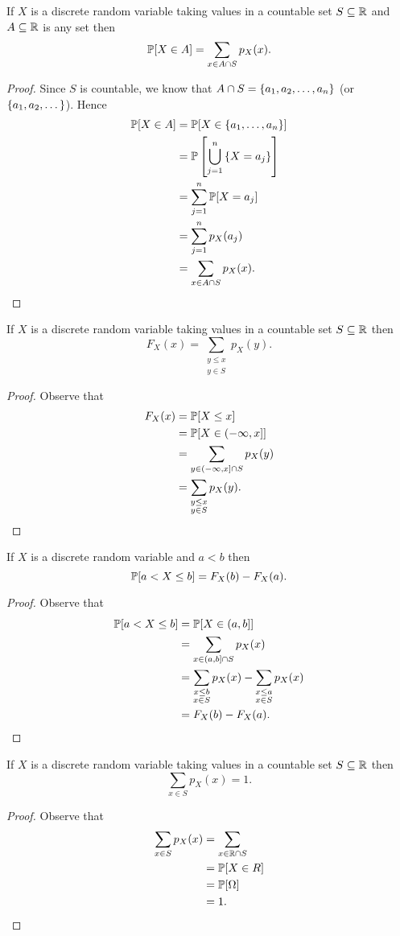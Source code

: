 \documentclass[class=article, crop=false]{standalone}
\begin{document}
  If $X$ is a discrete random variable taking values in a countable set $S\sse \R$ and $A\sse \R$ is any set then
  \[
    \P[X\in A] = \sum_{x\in A\cap S} p_X(x).
  \]
  \begin{proof}
    Since $S$ is countable, we know that $A\cap S = \set{a_1,a_2,\dotsc,a_n}$ (or $\set{a_1,a_2,\dotsc}$). Hence
    \begin{align*}
      \P[X\in A] &= \P[X\in \set{a_1,\dotsc,a_n}] \\
                 &= \P\left[\bigcup_{j = 1}^n \set{X = a_j}\right] \\
                 &= \sum_{j=1}^{n} \P[X = a_j] \\
                 &= \sum_{j=1}^{n} p_X(a_j) \\
                 &= \sum_{x\in A\cap S}p_X(x).
    \end{align*}
  \end{proof}
  If $X$ is a discrete random variable taking values in a countable set $S\sse\R$ then
  \[
    F_X(x) = \sum_{\substack{y \leq x \\y\in S}} p_X(y).
  \]
  \begin{proof}
    Observe that
    \begin{align*}
      F_X(x) &= \P[X \leq x] \\
             &= \P[X\in (-\infty, x]] \\
             &= \sum_{y\in (-\infty, x]\cap S}p_X(y) \\
             &= \sum_{\substack{y \leq x \\y\in S}} p_X(y).
    \end{align*}
  \end{proof}
  If $X$ is a discrete random variable and $a < b$ then
  \[
    \P[a < X \leq b] = F_X(b) - F_X(a).
  \]
  \begin{proof}
    Observe that
    \begin{align*}
      \P[a < X \leq b] &= \P[X\in (a, b]] \\
                       &= \sum_{x\in (a, b]\cap S}p_X(x) \\
                       &= \sum_{\substack{x \leq b\\x \in S}}p_X(x) - \sum_{\substack{x \leq a\\x \in S}}p_X(x) \\
                       &= F_X(b) - F_X(a).
    \end{align*}
  \end{proof}
  If $X$ is a discrete random variable taking values in a countable set $S\sse \R$ then
  \[
    \sum_{x\in S}p_X(x) = 1.
  \]
  \begin{proof}
    Observe that
    \begin{align*}
      \sum_{x\in S}p_X(x) &= \sum_{x\in \R\cap S} \\
                          &= \P[X\in R] \\
                          &= \P[\Omega] \\
                          &= 1.
    \end{align*}
  \end{proof}
\end{document}
